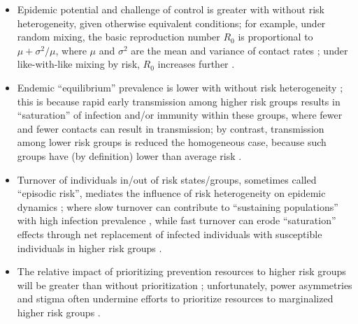 \begin{itemize}
  \item Epidemic potential and challenge of control
    is greater with \vs without risk heterogeneity, given otherwise equivalent conditions;
    for example, under random mixing,
    the basic reproduction number $R_0$ is proportional to $\mu + \sigma^2/\mu$,
    where $\mu$ and $\sigma^2$ are the mean and variance of contact rates \cite{Anderson1986};
    under like-with-like mixing by risk, $R_0$ increases further \cite{Jacquez1988}.
  \item Endemic ``equilibrium'' prevalence
    is lower with \vs without risk heterogeneity \cite{Anderson1986};
    this is because rapid early transmission among higher risk groups results in
    ``saturation'' of infection and/or immunity within these groups,
    where fewer and fewer contacts can result in transmission; by contrast,
    transmission among lower risk groups is reduced \vs the homogeneous case,
    because such groups have (by definition) lower than average risk \cite{Anderson1986}.
  \item Turnover of individuals in/out of risk states/groups, sometimes called ``episodic risk'',
    mediates the influence of risk heterogeneity on epidemic dynamics \cite{Stigum1994}; where
    slow turnover can contribute to ``sustaining populations''
    with high infection prevalence \cite{Watts2010}, while
    fast turnover can erode ``saturation'' effects through net replacement of
    infected individuals with susceptible individuals in higher risk groups \cite{Knight2020}.
  \item The relative impact of prioritizing prevention resources to higher risk groups
    will be greater than without prioritization \cite{Mishra2014mot};
    unfortunately, power asymmetries and stigma often undermine efforts to
    prioritize resources to marginalized higher risk groups \cite{Brown2019,Long2021,Mishra2021}.
\end{itemize}
